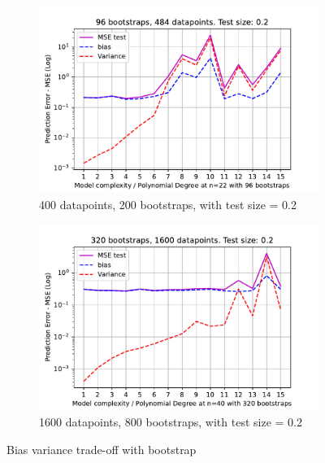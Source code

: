 \documentclass[11pt, a4paper]{article}
\begin{document}
\begin{figure}
  \centering
  \begin{subfigure}{0.49\textwidth}
    \centering
    \includegraphics[width=\textwidth]{figures/EX2_model_complexity_using_bootstrap_function_n_22_testsize_0.2.pdf}
    \caption{400 datapoints, 200 bootstraps, with test size = 0.2}
    \label{fig:bootstrap_bias_var_n_20}
  \end{subfigure}
  \hfill
  \begin{subfigure}{0.49\textwidth}
    \centering
    \includegraphics[width=\textwidth]{figures/EX2_model_complexity_using_bootstrap_function_n_40_testsize_0.2.pdf}
    \caption{1600 datapoints, 800 bootstraps, with test size = 0.2}
    \label{fig:bootstrap_bias_var_n_30}
  \end{subfigure}

  \caption{Bias variance trade-off with bootstrap}
  \label{fig:bootstrap_bias_var}
\end{figure}
\end{document}
